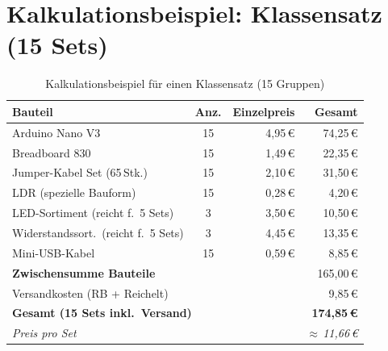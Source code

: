 \documentclass[a4paper,12pt]{article}
\begin{document}
\section{Kalkulationsbeispiel: Klassensatz (15 Sets)}

\begin{table}[h!]
\centering
\renewcommand{\arraystretch}{1.35}
\begin{tabular}{@{} l c r r @{}}
\toprule
\textbf{Bauteil} & \textbf{Anz.} & \textbf{Einzelpreis} & \textbf{Gesamt} \\
\midrule
Arduino Nano V3            & 15 & 4,95\,\euro{} &  74,25\,\euro{} \\
Breadboard 830             & 15 & 1,49\,\euro{} &  22,35\,\euro{} \\
Jumper-Kabel Set (65\,Stk.)& 15 & 2,10\,\euro{} &  31,50\,\euro{} \\
LDR (spezielle Bauform)    & 15 & 0,28\,\euro{} &   4,20\,\euro{} \\
LED-Sortiment (reicht f.~5 Sets) & 3 & 3,50\,\euro{} & 10,50\,\euro{} \\
Widerstandssort.\ (reicht f.~5 Sets) & 3 & 4,45\,\euro{} & 13,35\,\euro{} \\
Mini-USB-Kabel             & 15 & 0,59\,\euro{} &   8,85\,\euro{} \\
\midrule
\multicolumn{3}{l}{\textbf{Zwischensumme Bauteile}} & 165,00\,\euro{} \\
\multicolumn{3}{l}{Versandkosten (RB + Reichelt)} & 9,85\,\euro{} \\
\midrule
\multicolumn{3}{l}{\textbf{Gesamt (15 Sets inkl.\ Versand)}} & \textbf{174,85\,\euro{}} \\
\multicolumn{3}{l}{\textit{Preis pro Set}} & \textit{$\approx$\,11,66\,\euro{}} \\
\bottomrule
\end{tabular}
\caption{Kalkulationsbeispiel für einen Klassensatz (15 Gruppen)}
\label{tab:klassensatz}
\end{table}
\end{document}
